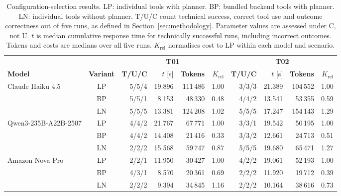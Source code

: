 \begin{table}[!b]
    \caption{Configuration-selection results. LP: individual tools with planner. BP: bundled backend tools with planner. LN: individual tools without planner.
T/U/C count technical success, correct tool use and outcome correctness out of five runs, as defined in Section~\ref{sec:methodology}.
Parameter values are assessed under C, not U.
$t$ is median cumulative response time for technically successful runs, including incorrect outcomes.
Tokens and costs are medians over all five runs.
$K_{\mathrm{rel}}$ normalises cost to LP within each model and scenario.}
    \label{tab:comparison-results}
    \centering
    \small
    \setlength{\tabcolsep}{3pt}
    \begin{tabular*}{\textwidth}{@{\extracolsep{\fill}}lcrrrr rrrr@{}}
        \toprule
        & & \multicolumn{4}{c}{\textbf{T01}} & \multicolumn{4}{c}{\textbf{T02}} \\
        \cmidrule(lr){3-6}\cmidrule(lr){7-10}
        \textbf{Model} & \textbf{Variant} & \textbf{T/U/C} & $t$ [s] & \textbf{Tokens} & $K_{\mathrm{rel}}$ & \textbf{T/U/C} & $t$ [s] & \textbf{Tokens} & $K_{\mathrm{rel}}$ \\
        \midrule
        Claude Haiku 4.5 & LP & 5/5/4 & 19.896 & 111\,486 & 1.00 & 3/3/3 & 21.389 & 104\,552 & 1.00 \\
         & BP & 5/5/1 & 8.153 & 48\,330 & 0.48 & 4/4/2 & 13.541 & 53\,355 & 0.59 \\
         & LN & 5/5/5 & 13.381 & 124\,208 & 1.02 & 5/5/5 & 17.247 & 154\,143 & 1.29 \\
        \midrule
        Qwen3-235B-A22B-2507 & LP & 4/4/2 & 21.767 & 67\,771 & 1.00 & 3/3/1 & 19.542 & 50\,195 & 1.00 \\
         & BP & 4/4/2 & 14.408 & 21\,416 & 0.33 & 3/3/2 & 12.661 & 24\,713 & 0.51 \\
         & LN & 2/2/2 & 15.568 & 59\,747 & 0.87 & 5/5/5 & 19.680 & 65\,471 & 1.27 \\
        \midrule
        Amazon Nova Pro & LP & 2/2/1 & 11.950 & 30\,427 & 1.00 & 4/2/2 & 19.061 & 52\,193 & 1.00 \\
         & BP & 4/3/1 & 8.570 & 20\,361 & 0.69 & 2/2/2 & 11.920 & 19\,712 & 0.39 \\
         & LN & 2/2/2 & 9.394 & 34\,845 & 1.16 & 2/2/2 & 10.164 & 38\,616 & 0.73 \\
        \bottomrule
    \end{tabular*}
\end{table}

